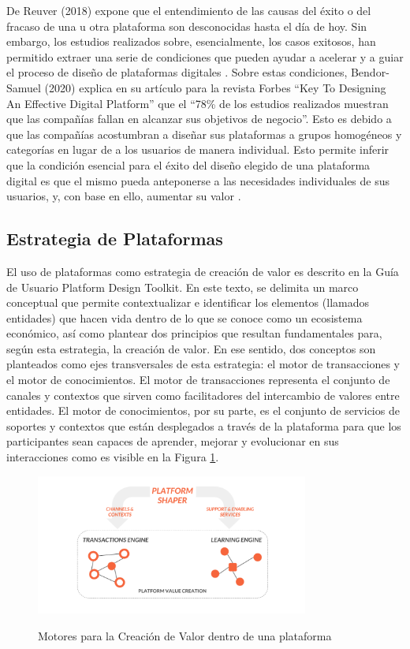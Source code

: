 De Reuver (2018) expone que el entendimiento de las causas del éxito o del fracaso de una u otra plataforma son desconocidas hasta el día de hoy. Sin embargo, los estudios realizados sobre, esencialmente, los casos exitosos, han permitido extraer una serie de condiciones que pueden ayudar a acelerar y a guiar el proceso de diseño de plataformas digitales \cite{deReuver2018}.
Sobre estas condiciones, Bendor-Samuel (2020) explica en su artículo para la revista Forbes “Key To Designing An Effective Digital Platform” que el “78\% de los estudios realizados muestran que las compañías fallan en alcanzar sus objetivos de negocio”. Esto es debido a que las compañías acostumbran a diseñar sus plataformas a grupos homogéneos y categorías en lugar de a los usuarios de manera individual.
Esto permite inferir que la condición esencial para el éxito del diseño elegido de una plataforma digital es que el mismo pueda anteponerse a las necesidades individuales de sus usuarios, y, con base en ello, aumentar su valor \cite{bendorSamuel2020}.

\subsection{Estrategia de Plataformas}

El uso de plataformas como estrategia de creación de valor es descrito en la Guía de Usuario Platform Design Toolkit. En este texto, se delimita un marco conceptual que permite contextualizar e identificar los elementos (llamados entidades) que hacen vida dentro de lo que se conoce como un ecosistema económico, así como plantear dos principios que resultan fundamentales para, según esta estrategia, la creación de valor. En ese sentido, dos conceptos son planteados  como ejes transversales de esta estrategia: el motor de transacciones y el motor de conocimientos.
El motor de transacciones representa el conjunto de canales y contextos que sirven como facilitadores del intercambio de valores entre entidades.
El motor de conocimientos, por su parte, es el conjunto de servicios de soportes y contextos que están desplegados a través de la plataforma para que los participantes sean capaces de aprender, mejorar y evolucionar en sus interacciones \cite{boundarylessplatform} como es visible en la Figura \ref{figure:platformShaper}.

\begin{figure}[H]
\centering
\includegraphics[width=0.80\textwidth]{img/2.png}
\caption{Motores para la Creación de Valor dentro de una plataforma}\cite{boundarylessplatform}
\label{figure:platformShaper}
\end{figure}


